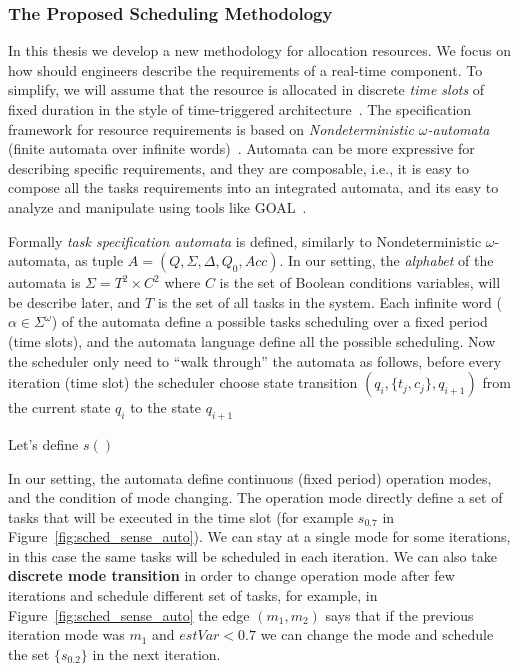 \documentclass[ twoside, 12pt ]{article}
\begin{document}
{%
\subsubsection{The Proposed Scheduling Methodology}
In this thesis we develop a new methodology for allocation resources. We focus on how should engineers describe the requirements of a real-time component.
To simplify, we will assume that the resource is allocated in discrete \textit{time slots} of fixed duration in the style of time-triggered architecture~\cite{RTComposer}.
The specification framework for resource requirements is based on \textit{Nondeterministic $\omega$-automata} (finite automata over infinite words)~\cite{???}.
Automata can be more expressive for describing specific requirements, and they are composable, i.e., it is easy to compose all the tasks requirements into an integrated automata, and its easy to analyze and manipulate using tools like GOAL~\cite{???}.


Formally \textit{task specification automata} is defined, similarly to Nondeterministic $\omega$-automata, as tuple $A=(Q,\Sigma,\Delta,Q_0,Acc)$.
In our setting, the \textit{alphabet} of the automata is $\Sigma = T^2 \times C^2$ where 
$C$ is the set of Boolean conditions variables, will be describe later, and $T$ is the set of all tasks in the system.
Each infinite word ($\alpha \in \Sigma^\omega$) of the automata define a possible tasks scheduling over a fixed period (time slots), and the automata language define all the possible scheduling.
Now the scheduler only need to ``walk through'' the automata as follows, before every iteration (time slot) the scheduler choose state transition $(q_i , \{t_j , c_j\}, q_{i+1})$ from the current state $q_i$ to the state $q_{i+1}$


Let's define $s()$









In our setting, the automata define continuous (fixed period) operation modes, and the condition of mode changing.
The operation mode directly define a set of tasks that will be executed in the time slot (for example $s_{0.7}$ in Figure~\ref{fig:sched_sense_auto}).
We can stay at a single mode for some iterations, in this case the same tasks will be scheduled in each iteration. 
We can also take \textbf{discrete mode transition} in order to change operation mode after few iterations and schedule different set of tasks, for example, in Figure~\ref{fig:sched_sense_auto} the edge $(m_1,m_2)$ says that if the previous iteration mode was $m_1$ and $estVar < 0.7$ we can change the mode and schedule the set $\{s_{0.2}\}$ in the next iteration.

}
\end{document}
